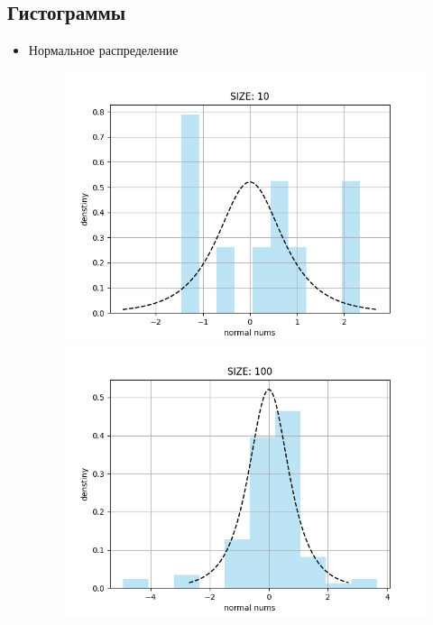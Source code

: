 \subsection{Гистограммы}
\begin{itemize}
	\item{Нормальное распределение}
	\begin{figure}[H]
		\begin{center}
			\includegraphics[scale=0.333]{resources/normal10.png}
			\includegraphics[scale=0.333]{resources/normal100.png}

\end{center}
\end{figure}
\end{itemize}
